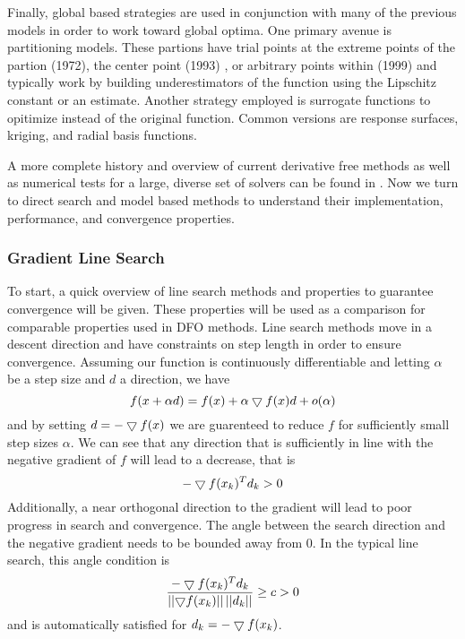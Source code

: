 Finally, global based strategies are used in conjunction with many of the previous models in order to work toward global optima. One primary avenue is partitioning models.  These partions have trial points at the extreme points of the partion (1972)\cite{shubert_1972}, the center point (1993) \cite{jones_1993}, or arbitrary points within (1999) \cite{huyer_1999} and typically work by building underestimators of the function using the Lipschitz constant or an estimate.  Another strategy employed is surrogate functions to opitimize instead of the original function.  Common versions are response surfaces, kriging, and radial basis functions.  

A more complete history and overview of current derivative free methods as well as numerical tests for a large, diverse set of solvers can be found in \cite{rios_2013}.  Now we turn to direct search and model based methods to understand their implementation, performance, and convergence properties.


\subsubsection*{Gradient Line Search}
To start, a quick overview of line search methods and properties to guarantee convergence will be given.  These properties will be used as a comparison for comparable properties used in DFO methods.  Line search methods move in a descent direction and have constraints on step length in order to ensure convergence.  Assuming our function is continuously differentiable and letting $\alpha$ be a step size and $d$ a direction, we have
\begin{equation}
f(x + \alpha d ) = f(x) + \alpha \bigtriangledown f(x) d  + o (\alpha)
\end{equation}
and by setting $d = -\bigtriangledown f(x)$ we are guarenteed to reduce $f$ for sufficiently small step sizes $\alpha$.  We can see that any direction that is sufficiently in line with the negative gradient of $f$ will lead to a decrease, that is
\begin{equation}
-\bigtriangledown f(x_k)^T d_k > 0
\end{equation}
Additionally, a near orthogonal direction to the gradient will lead to poor progress in search and convergence.  The angle between the search direction and the negative gradient needs to be bounded away from 0.  In the typical line search, this angle condition is
\begin{equation}
\frac{-\bigtriangledown f(x_k)^T d_k}{\left| \left| {\bigtriangledown f(x_k) } \right| \right| \left| \left| {d_k} \right| \right|} \geq c > 0
\end{equation}
and is automatically satisfied for $d_k = -\bigtriangledown f(x_k)$.

